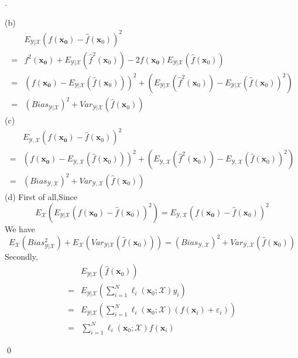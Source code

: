 \documentclass[12pt]{article}
\newenvironment{sol}
  {\par\vspace{3mm}\noindent{\it Solution}.}
  {\qed}
\begin{document}
\begin{sol}
\begin{flushleft}
(b)
\begin{equation}
\nonumber
\begin{split}
&E_{\mathcal{Y}\vert\mathcal{X}}(f(\bm{x_0})-\hat{f}(\bm{x}_0))^2 \\
=&f^2(\bm{x_0})+E_{\mathcal{Y}\vert\mathcal{X}}(\hat{f}^2(\bm{x}_0))-2f(\bm{x_0})E_{\mathcal{Y}\vert\mathcal{X}}(\hat{f}(\bm{x}_0))\\
=&(f(\bm{x_0})-E_{\mathcal{Y}\vert\mathcal{X}}(\hat{f}(\bm{x}_0)))^2+(E_{\mathcal{Y}\vert\mathcal{X}}(\hat{f}^2(\bm{x}_0))-E_{\mathcal{Y}\vert\mathcal{X}}(\hat{f}(\bm{x}_0))^2)\\
=&(Bias_{\mathcal{Y}\vert\mathcal{X}})^2+Var_{\mathcal{Y}\vert\mathcal{X}}(\hat{f}(\bm{x}_0))
\end{split}
\end{equation}
(c)
\begin{equation}
\nonumber
\begin{split}
&E_{\mathcal{Y},\mathcal{X}}(f(\bm{x_0})-\hat{f}(\bm{x}_0))^2 \\
=&(f(\bm{x_0})-E_{\mathcal{Y},\mathcal{X}}(\hat{f}(\bm{x}_0)))^2+(E_{\mathcal{Y},\mathcal{X}}(\hat{f}^2(\bm{x}_0))-E_{\mathcal{Y},\mathcal{X}}(\hat{f}(\bm{x}_0))^2)\\
=&(Bias_{\mathcal{Y},\mathcal{X}})^2+Var_{\mathcal{Y},\mathcal{X}}(\hat{f}(\bm{x}_0))
\end{split}
\end{equation}
(d)
First of all,Since
$$
E_{\mathcal{X}}(E_{\mathcal{Y}\vert\mathcal{X}}(f(\bm{x_0})-\hat{f}(\bm{x}_0))^2) = E_{\mathcal{Y},\mathcal{X}}(f(\bm{x_0})-\hat{f}(\bm{x}_0))^2
$$
We have
$$
E_{\mathcal{X}}(Bias^2_{\mathcal{Y}\vert\mathcal{X}})+E_{\mathcal{X}}(Var_{\mathcal{Y}\vert\mathcal{X}}(\hat{f}(\bm{x}_0)))
=(Bias_{\mathcal{Y},\mathcal{X}})^2+Var_{\mathcal{Y},\mathcal{X}}(\hat{f}(\bm{x}_0))
$$
Secondly, %
\begin{equation}
\nonumber
\begin{split}
&E_{\mathcal{Y}\vert\mathcal{X}}(\hat{f}(\bm{x}_0))\\
=&E_{\mathcal{Y}\vert\mathcal{X}}\left(\sum_{i=1}^{N}\ell _i(\bm{x}_0;\mathcal{X})y_i\right)\\
=&E_{\mathcal{Y}\vert\mathcal{X}}\left(\sum_{i=1}^{N}\ell _i(\bm{x}_0;\mathcal{X})(f(\bm{x}_i)+\varepsilon_i)\right)\\
=&\sum_{i=1}^{N}\ell _i(\bm{x}_0;\mathcal{X})f(\bm{x}_i)
\end{split}
\end{equation}

\end{flushleft}
\end{sol}
\end{document}
